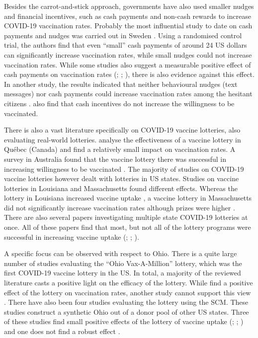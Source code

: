 \documentclass{scrbook}
\begin{document}
Besides the carrot-and-stick approach, governments have also used
smaller nudges and financial incentives, such as cash payments and
non-cash rewards to increase COVID-19 vaccination rates. Probably the
most influential study to date on cash payments and nudges was carried
out in Sweden \parencite{campos-mercade_monetary_2021}. Using a
randomised control trial, the authors find that even ``small'' cash
payments of around 24 US dollars can significantly increase vaccination
rates, while small nudges could not increase vaccination rates. While
some studies also suggest a measurable positive effect of cash payments
on vaccination rates (\cite{wong_guaranteed_2022};
\cite{kluver_incentives_2021}; \cite{kim_vaccination_2021-1}), there is
also evidence against this effect. In another study, the results
indicated that neither behavioural nudges (text messages) nor cash
payments could increase vaccination rates among the hesitant citizens
\parencite{jacobson_can_2022}. \textcite{sprengholz_money_2021} also
find that cash incentives do not increase the willingness to be
vaccinated.

There is also a vast literature specifically on COVID-19 vaccine
lotteries, also evaluating real-world lotteries.
\textcite{dube_exploring_2022} analyse the effectiveness of a vaccine
lottery in Québec (Canada) and find a relatively small impact on
vaccination rates. A survey in Australia found that the vaccine lottery
there was successful in increasing willingness to be vaccinated
\parencite{jun_association_2022}. The majority of studies on COVID-19
vaccine lotteries however dealt with lotteries in US states. Studies on
vaccine lotteries in Louisiana and Massachusetts found different
effects. Whereas the lottery in Louisiana increased vaccine uptake
\parencite{wang_moving_2023}, a vaccine lottery in Massachusetts did not
significantly increase vaccination rates although prizes were higher
\parencite{kim_did_2023}. There are also several papers investigating
multiple state COVID-19 lotteries at once. All of these papers find that
most, but not all of the lottery programs were successful in increasing
vaccine uptake (\cite{robertson_are_2021};
\cite{acharya_implementation_2021}; \cite{fuller_assessing_2022}).

A specific focus can be observed with respect to Ohio. There is a quite
large number of studies evaluating the ``Ohio Vax-A-Million'' lottery,
which was the first COVID-19 vaccine lottery in the US. In total, a
majority of the reviewed literature casts a positive light on the
efficacy of the lottery. While \textcite{mallow_covid-19_2022} find a
positive effect of the lottery on vaccination rates, another study
cannot support this view \parencite{walkey_lottery-based_2021}. There
have also been four studies evaluating the lottery using the SCM. These
studies construct a synthetic Ohio out of a donor pool of other US
states. Three of these studies find small positive effects of the
lottery of vaccine uptake (\cite{brehm_ohio_2022};
\cite{barber_conditional_2022}; \cite{sehgal_impact_2021}) and one does
not find a robust effect \parencite{lang_did_2022}.
\end{document}
